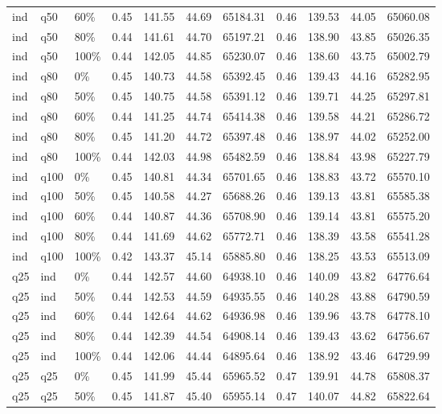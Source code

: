 \begin{longtable}{lllrrrrrrrr}
  ind & q50 & 60\% & 0.45 & 141.55 & 44.69 & 65184.31 & 0.46 & 139.53 & 44.05 & 65060.08 \\ 
  ind & q50 & 80\% & 0.44 & 141.61 & 44.70 & 65197.21 & 0.46 & 138.90 & 43.85 & 65026.35 \\ 
  ind & q50 & 100\% & 0.44 & 142.05 & 44.85 & 65230.07 & 0.46 & 138.60 & 43.75 & 65002.79 \\ 
  ind & q80 & 0\% & 0.45 & 140.73 & 44.58 & 65392.45 & 0.46 & 139.43 & 44.16 & 65282.95 \\ 
  ind & q80 & 50\% & 0.45 & 140.75 & 44.58 & 65391.12 & 0.46 & 139.71 & 44.25 & 65297.81 \\ 
  ind & q80 & 60\% & 0.44 & 141.25 & 44.74 & 65414.38 & 0.46 & 139.58 & 44.21 & 65286.72 \\ 
  ind & q80 & 80\% & 0.45 & 141.20 & 44.72 & 65397.48 & 0.46 & 138.97 & 44.02 & 65252.00 \\ 
  ind & q80 & 100\% & 0.44 & 142.03 & 44.98 & 65482.59 & 0.46 & 138.84 & 43.98 & 65227.79 \\ 
  ind & q100 & 0\% & 0.45 & 140.81 & 44.34 & 65701.65 & 0.46 & 138.83 & 43.72 & 65570.10 \\ 
  ind & q100 & 50\% & 0.45 & 140.58 & 44.27 & 65688.26 & 0.46 & 139.13 & 43.81 & 65585.38 \\ 
  ind & q100 & 60\% & 0.44 & 140.87 & 44.36 & 65708.90 & 0.46 & 139.14 & 43.81 & 65575.20 \\ 
  ind & q100 & 80\% & 0.44 & 141.69 & 44.62 & 65772.71 & 0.46 & 138.39 & 43.58 & 65541.28 \\ 
  ind & q100 & 100\% & 0.42 & 143.37 & 45.14 & 65885.80 & 0.46 & 138.25 & 43.53 & 65513.09 \\ 
  q25 & ind & 0\% & 0.44 & 142.57 & 44.60 & 64938.10 & 0.46 & 140.09 & 43.82 & 64776.64 \\ 
  q25 & ind & 50\% & 0.44 & 142.53 & 44.59 & 64935.55 & 0.46 & 140.28 & 43.88 & 64790.59 \\ 
  q25 & ind & 60\% & 0.44 & 142.64 & 44.62 & 64936.98 & 0.46 & 139.96 & 43.78 & 64778.10 \\ 
  q25 & ind & 80\% & 0.44 & 142.39 & 44.54 & 64908.14 & 0.46 & 139.43 & 43.62 & 64756.67 \\ 
  q25 & ind & 100\% & 0.44 & 142.06 & 44.44 & 64895.64 & 0.46 & 138.92 & 43.46 & 64729.99 \\ 
  q25 & q25 & 0\% & 0.45 & 141.99 & 45.44 & 65965.52 & 0.47 & 139.91 & 44.78 & 65808.37 \\ 
  q25 & q25 & 50\% & 0.45 & 141.87 & 45.40 & 65955.14 & 0.47 & 140.07 & 44.82 & 65822.64 \\ 

\end{longtable}
